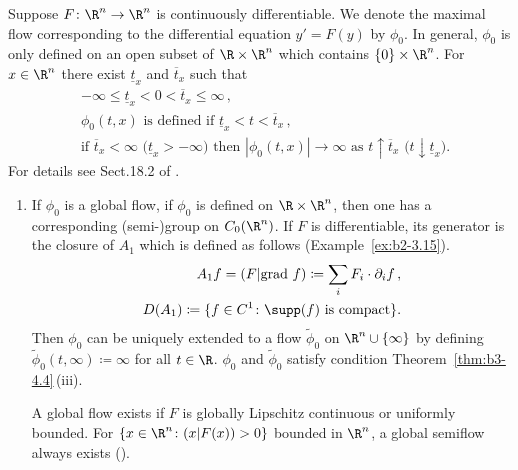 \begin{example}\label{ex:b3-4.6}
	Suppose $F \colon \R^n \to \R^n$ is continuously differentiable.
	We denote the maximal flow corresponding to the differential equation%
    $y' = F(y)$ by $\phi_{0}$.
	In general, $\phi_{0}$ is only defined on an open subset of\/ $\R \times \R^n$ which contains $\{0\} \times \R^n$.
	For $x \in \R^n$ there exist $\underline{t}_{x}$ and $\overline{t}_{x}$ such that
	\begin{equation}\label{eq:b3-4.11}
		\begin{aligned}
			&-\infty \leq \underline{t}_{x} < 0 < \overline{t}_{x} \leq \infty\,, \\
			&\phi_{0}(t,x) \text{ is defined if } \underline{t}_{x} < t < \overline{t}_{x}\,, \\
			&\text{if } \overline{t}_{x} < \infty \text{ (}\underline{t}_{x} > -\infty\text{)} \text{ then } |\phi_{0}(t,x)| \to \infty \text{ as } t\uparrow\overline{t}_{x} \text{ (}t\downarrow\underline{t}_{x}\text{)}.
		\end{aligned}
	\end{equation}
	For details see Sect.18.2 of \textcite{dieudonne:1971}.
	\begin{enumerate}[\upshape (a), wide, labelindent=.25em]
	\item
	If\/ $\phi_{0}$ is a global flow, \ie if\/ $\phi_{0}$ is defined on $\R \times \R^n$, then one has a corresponding (semi-)group on $C_{0}(\R^n)$.
	If\/ $F$ is differentiable, its generator is the closure of\/ $A_{1}$ which is defined as follows (\cf Example~\ref{ex:b2-3.15}).
	\begin{equation}\label{eq:b3-4.12}
		\begin{aligned}
			A_{1}f = (F|\text{grad }f) \coloneq 
            {  \sum_i F_{i} \cdot \partial_{i}f} \,, \\
			D(A_{1}) \coloneq \{f \in C^1 \colon \supp(f)  \text{ is compact}\}.
		\end{aligned}
	\end{equation}
	Then $\phi_{0}$ can be uniquely extended to a flow $\tilde{\phi}_{0}$ on $\R^n\cup\{\infty\}$ by defining $\tilde{\phi}_{0}(t,\infty) \coloneq \infty$ for all $t \in \R$.
	$\phi_{0}$ and $\tilde{\phi}_{0}$ satisfy condition Theorem~\ref{thm:b3-4.4}\,(iii).

    A global flow exists if\/ $F$ is globally Lipschitz continuous or uniformly bounded. 
    For $\{x \in \R^n \colon (x|F(x)) > 0\}$ bounded in $\R^n$, a global semiflow always exists (\cf \textcite[Section~5.2]{deimling:1977}).
    

\end{enumerate}
\end{example}
